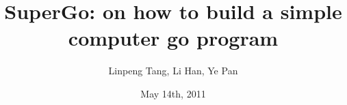\documentclass{article}
\theoremstyle{definition}
\theoremstyle{remark}
\numberwithin{equation}{section}
\begin{document}

\title{SuperGo: on how to build a simple computer go program}
\date{May 14th, 2011}
\author{Linpeng Tang, Li Han, Ye Pan}
\maketitle


\end{document}

